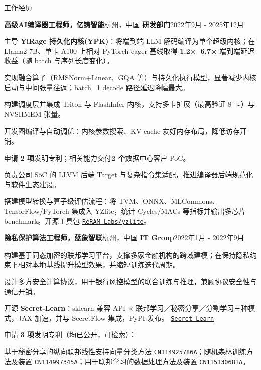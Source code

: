 \documentclass{resume} %
\newcommand{\repo}[2]{\href{#2}{\small\nolinkurl{#1}}}
\begin{document}
\begin{rSection}{工作经历}
\begin{rSubsection}{\textbf{高级AI编译器工程师，亿铸智能}}{杭州，中国}
{\textbf{研发部门}}{2022年9月 - 2025年12月}
\item {主导 {\textbf{YiRage 持久化内核(YPK)}}：将端到端 LLM 解码编译为单个超级内核；在 Llama2-7B、单卡 A100 上相对 PyTorch eager 基线取得 {\textbf{1.2×–6.7×}} 端到端延迟收益（随 batch 与序列长度变化）。}\\
\item {实现融合算子（RMSNorm+Linear、GQA 等）与持久化执行模型，显著减少内核启动与中间张量往返；batch=1 decode 路径延迟降幅最大。}\\
\item {构建调度层并集成 Triton 与 FlashInfer 内核，支持多卡扩展（最高验证 8 卡）与 NVSHMEM 张量。}\\
\item {开发图编译与自动调优：内核参数搜索、KV-cache 友好内存布局，降低访存开销。}\\
\item {申请 {\textbf{2 项}}发明专利；相关能力交付{\textbf{2 个}}数据中心客户 PoC。}\\
\item {负责公司 SoC 的 LLVM 后端 Target 与复杂指令集适配，推进编译器后端规范化与软件生态建设。}\\
\item {搭建模型转换与算子级评估流程：将 TVM、ONNX、MLCommons、TensorFlow/PyTorch 集成入 YZlite，统计 Cycles/MACs 等指标并输出多芯片 benchmark。开源工具包 \repo{ReRAM-Labs/yzlite}{https://github.com/ReRAM-Labs/yzlite}。}\\
\end{rSubsection}

\begin{rSubsection}{\textbf{隐私保护算法工程师，蓝象智联}}{杭州，中国}
{\textbf{IT Group}}{2022年1月 - 2022年9月}
\item {构建基于同态加密的联邦学习平台，支撑多家金融机构的跨域建模；在保持隐私约束下相对本地基线提升模型效果，并缩短训练迭代周期。}\\
\item {设计多方安全计算协议，用于银行风控模型的联合训练与推理，兼顾协议安全性与通信开销。}\\
\item {开源 {\textbf{Secret-Learn}}：sklearn 兼容 API × 联邦学习／秘密分享／分割学习三种模式，JAX 加速，并与 SecretFlow 集成，PyPI 发布。 \repo{Secret-Learn}{https://github.com/chenxingqiang/Secret-Learn}}\\
\item {申请 {\textbf{3 项}}发明专利（均已公开，可检索）：}\\
\item {基于秘密分享的纵向联邦线性支持向量分类方法 \repo{CN114925786A}{https://patents.google.com/patent/CN114925786A/en}；随机森林训练方法及装置 \repo{CN114997345A}{https://patents.google.com/patent/CN114997345A/en}；用于联邦学习的数据处理方法及装置 \repo{CN115130681A}{https://patents.google.com/patent/CN115130681A/en}。}\\
\end{rSubsection}


\end{rSection}
\end{document}
